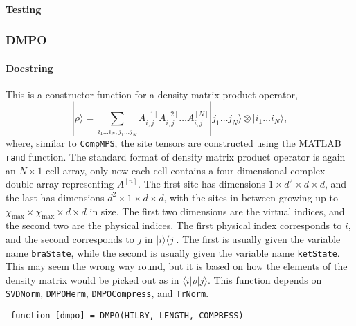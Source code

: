  \paragraph{Testing}

 \subsubsection{DMPO}
 \paragraph{Docstring} This is a constructor function for a density matrix product operator,
 \begin{equation}
 |\bar{\rho} \rangle = \sum_{i_{1} \ldots i_{N}, j_{1} \ldots j_{N}} A^{[1]}_{i,j} A^{[2]}_{i,j} \ldots A^{[N]}_{i,j} | j_{1} \ldots j_{N} \rangle \otimes |i_{1} \ldots i_{N} \rangle,
 \label{eq:vs3-1}
 \end{equation}
 where, similar to \lstinline$CompMPS$, the site tensors are constructed using the MATLAB \lstinline$rand$ function. The standard format of density matrix product operator is again an \(N \times 1\) cell array, only now each cell contains a four dimensional complex double array representing \(A^{[n]}\). The first site has dimensions \(1 \times d^{2} \times d \times d\), and the last has dimensions \(d^{2} \times 1 \times d \times d\), with the sites in between growing up to \(\chi_{\mathrm{max}} \times \chi_{\mathrm{max}} \times d \times d\) in size. The first two dimensions are the virtual indices, and the second two are the physical indices. The first physical index corresponds to \(i\), and the second corresponds to \(j\) in \(| i \rangle \langle j|\). The first is usually given the variable name \lstinline$braState$, while the second is usually given the variable name \lstinline$ketState$. This may seem the wrong way round, but it is based on how the elements of the density matrix would be picked out as in \(\langle i | \rho | j \rangle\). This function depends on \lstinline$SVDNorm$, \lstinline$DMPOHerm$, \lstinline$DMPOCompress$, and \lstinline$TrNorm$.
 \begin{lstlisting}
 function [dmpo] = DMPO(HILBY, LENGTH, COMPRESS) \end{lstlisting}
